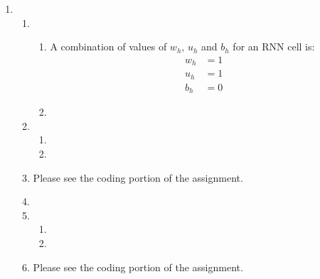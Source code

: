 \documentclass[10pt,reqno]{amsart}
\begin{document}
\begin{enumerate}[topsep=0pt,itemsep=3ex,partopsep=1ex,parsep=1ex]
\item
  \begin{enumerate}[itemsep=2ex]
  \item 
    \begin{enumerate}[itemsep=2ex]
      \item A combination of values of $w_h$, $u_h$ and $b_h$ for an RNN cell is:
        \begin{align*}
          w_h &= 1 \\
          u_h &= 1 \\
          b_h &= 0
        \end{align*}
      \item 
    \end{enumerate}
  \item
    \begin{enumerate}[itemsep=2ex]
      \item
      \item 
    \end{enumerate}
  \item Please see the coding portion of the assignment.
  \item %
  \item 
    \begin{enumerate}[itemsep=2ex]
      \item
      \item 
    \end{enumerate}
  \item Please see the coding portion of the assignment.
  \end{enumerate}


\end{enumerate}
\end{document}
